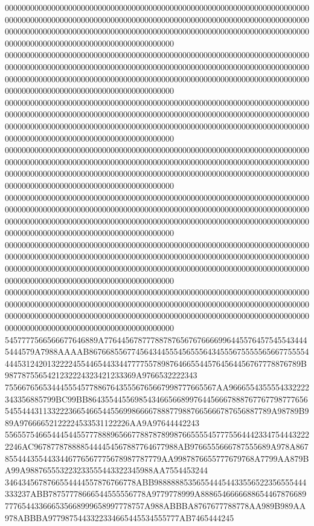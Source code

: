 0000000000000000000000000000000000000000000000000000000000000000000000000000000000000000000000000000000000000000000000000000000000000000000000000000000000000000000000000000000000000000000000000000000000000000000000000000000000000000000000000000000000000000
0000000000000000000000000000000000000000000000000000000000000000000000000000000000000000000000000000000000000000000000000000000000000000000000000000000000000000000000000000000000000000000000000000000000000000000000000000000000000000000000000000000000000000
0000000000000000000000000000000000000000000000000000000000000000000000000000000000000000000000000000000000000000000000000000000000000000000000000000000000000000000000000000000000000000000000000000000000000000000000000000000000000000000000000000000000000000
0000000000000000000000000000000000000000000000000000000000000000000000000000000000000000000000000000000000000000000000000000000000000000000000000000000000000000000000000000000000000000000000000000000000000000000000000000000000000000000000000000000000000000
0000000000000000000000000000000000000000000000000000000000000000000000000000000000000000000000000000000000000000000000000000000000000000000000000000000000000000000000000000000000000000000000000000000000000000000000000000000000000000000000000000000000000000
0000000000000000000000000000000000000000000000000000000000000000000000000000000000000000000000000000000000000000000000000000000000000000000000000000000000000000000000000000000000000000000000000000000000000000000000000000000000000000000000000000000000000000
0000000000000000000000000000000000000000000000000000000000000000000000000000000000000000000000000000000000000000000000000000000000000000000000000000000000000000000000000000000000000000000000000000000000000000000000000000000000000000000000000000000000000000
5457777566566677646889A7764456787778878765676766669964455764575455434445444579A7988AAAAB86766855677456434455545655564345556755555656677555544445312420132222455446544334477775578987646655445764564456767778876789B9877875565421232224323421233369A9766532222343
75566765653444555457788676435556765667998777665567AA9666554355554332222343356885799BC99BB8643554455698543466566899764456667888767767798777656545544431133222366546654455699866667888779887665666787656887789A98789B989A97666652122224533531122226AA9A97644442243
5565575466544454455777888965667788787899876655554577755644423347544432222246AC9678778788885444454567887764677988AB9766555666787555689A978A8678554443554433446776567775678987787779AA9987876655777679768A7799AA879BA99A988765553223233555443322345988AA7554453244
3464345678766554444557876766778ABB988888853565544454433556522356555444333237ABB78757778666544555556778A9779778999A8886546666688654467876689777654433666535668999658997778757A988ABBBA8767677788778AA989B989AA978ABBBA9779875443322334665445534555777AB7465444245
